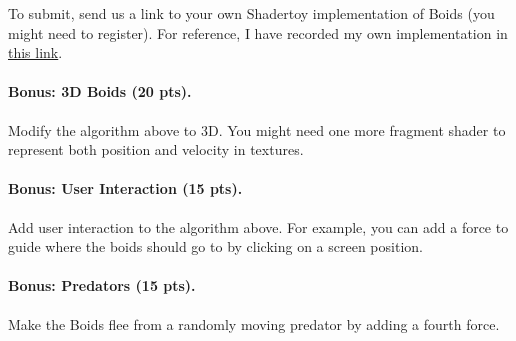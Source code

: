 To submit, send us a link to your own Shadertoy implementation of Boids (you might need to register). For reference, I have recorded my own implementation in \href{https://cseweb.ucsd.edu/~tzli/cse167/boids.webm}{this link}.

\paragraph{Bonus: 3D Boids (20 pts).} Modify the algorithm above to 3D. You might need one more fragment shader to represent both position and velocity in textures.

\paragraph{Bonus: User Interaction (15 pts).} Add user interaction to the algorithm above. For example, you can add a force to guide where the boids should go to by clicking on a screen position.

\paragraph{Bonus: Predators (15 pts).} Make the Boids flee from a randomly moving predator by adding a fourth force. 


